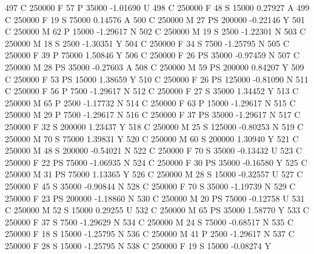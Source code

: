 \documentclass{article}
\begin{document}
\begin{Schunk}
\begin{Soutput}
497       C     250000   F  57         P  35000  -1.01690    U
498       C     250000   F  48         S  15000   0.27927    A
499       C     250000   F  19         S  75000   0.14576    A
500       C     250000   M  27        PS 200000  -0.22146    Y
501       C     250000   M  62         P  15000  -1.29617    N
502       C     250000   M  19         S   2500  -1.22301    N
503       C     250000   M  18         S   2500  -1.30351    Y
504       C     250000   F  34         S   7500  -1.25795    N
505       C     250000   F  39         P  75000   1.50846    Y
506       C     250000   F  26        PS  35000  -0.97459    N
507       C     250000   M  28        PS  35000  -0.27603    A
508       C     250000   M  59        PS 200000   0.84207    Y
509       C     250000   F  53        PS  15000   1.38659    Y
510       C     250000   F  26        PS 125000  -0.81090    N
511       C     250000   F  56         P   7500  -1.29617    N
512       C     250000   F  27         S  35000   1.34452    Y
513       C     250000   M  65         P   2500  -1.17732    N
514       C     250000   F  63         P  15000  -1.29617    N
515       C     250000   M  29         P   7500  -1.29617    N
516       C     250000   F  37        PS  35000  -1.29617    N
517       C     250000   F  32         S 200000   1.23437    Y
518       C     250000   M  25         S 125000  -0.80253    N
519       C     250000   M  70         S  75000   1.39831    Y
520       C     250000   M  60         S 200000   1.30940    Y
521       C     250000   M  48         S 200000  -0.54021    N
522       C     250000   F  70         S  35000  -0.13432    U
523       C     250000   F  22        PS  75000  -1.06935    N
524       C     250000   F  30        PS  35000  -0.16580    Y
525       C     250000   M  31        PS  75000   1.13365    Y
526       C     250000   M  28         S  15000  -0.32557    U
527       C     250000   F  45         S  35000  -0.90844    N
528       C     250000   F  70         S  35000  -1.19739    N
529       C     250000   F  23        PS 200000  -1.18860    N
530       C     250000   M  20        PS  75000  -0.12758    U
531       C     250000   M  52         S  15000   0.29255    U
532       C     250000   M  65        PS  35000   1.58770    Y
533       C     250000   F  37         S   7500  -1.29629    N
534       C     250000   M  24         S  75000  -0.68517    N
535       C     250000   F  18         S  15000  -1.25795    N
536       C     250000   M  41         P   2500  -1.29617    N
537       C     250000   F  28         S  15000  -1.25795    N
538       C     250000   F  19         S  15000  -0.08274    Y

\end{Soutput}
\end{Schunk}
\end{document}
